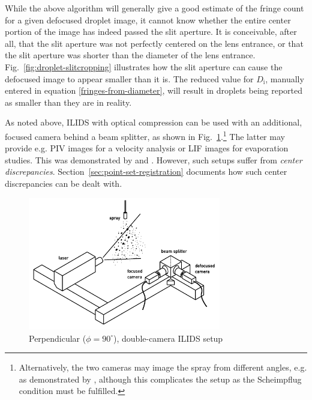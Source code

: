 \documentclass[11.5pt,oneside]{book}
\newcommand*{\figref}[1]{Fig.~\ref{#1}}
\newcommand*{\secref}[1]{Section~\ref{#1}}
\begin{document}
While the above algorithm will generally give a good estimate of the fringe
count for a given defocused droplet image, it cannot know whether the entire
center portion of the image has indeed passed the slit aperture. It is
conceivable, after all, that the slit aperture was not perfectly centered on the
lens entrance, or that the slit aperture was shorter than the diameter of the
lens entrance. \figref{fig:droplet-slitcropping} illustrates how the slit
aperture can cause the defocused image to appear smaller than it is. The
reduced value for $D_\text{i}$, manually entered in equation
\eqref{fringes-from-diameter}, will result
in droplets being reported as smaller than they are in reality.

As noted above, ILIDS with optical compression can be used with an additional,
focused camera behind a beam splitter, as shown in
\figref{fig:ipi-setup-double}.\footnote{Alternatively, the two cameras may image
    the spray from different angles, e.g. as demonstrated by \citet{Glover95},
    although this complicates the setup as the Scheimpflug condition must be
fulfilled.} The latter may provide e.g. PIV images for a
velocity analysis or LIF images for evaporation studies. This was demonstrated
by \citet{Hardalupas10} and \citet{Hardalupas10a}. However, such setups suffer
from \emph{center discrepancies}. \secref{sec:point-set-registration} documents
how such center discrepancies can be dealt with.

\begin{figure}
\centering
\includegraphics[width=0.75\textwidth]{img/setup/ipi_setup_double.pdf}
\caption{Perpendicular ($\phi=90^\circ$), double-camera ILIDS setup}
\label{fig:ipi-setup-double}
\end{figure}
\end{document}
